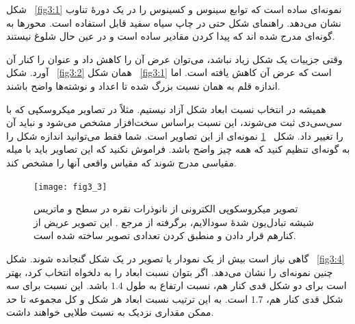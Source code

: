 شکل~%
\ref{fig3:1} 
نمونه‌ای ساده است که توابع سینوس و کسینوس را در یک دورهٔ تناوب نشان می‌دهد. راهنمای شکل حتی در چاپ سیاه سفید قابل استفاده است. محورها به گونه‌ای مدرج شده اند که پیدا کردن مقادیر ساده است و در عین حال شلوغ نیستند.

وقتی جزییات یک شکل زیاد نباشد، می‌توان عرض آن را کاهش داد و عنوان را کنار آن آورد. شکل~%
\ref{fig3:2} 
همان شکل~%
\ref{fig3:1} 
است که عرض آن کاهش یافته است. اما اندازه قلم به همان نسبت بزرگ شده تا اعداد و نوشته‌ها واضح باشند.

\begin{figure}[!tbhp] %
\end{figure}

همیشه در انتخاب نسبت ابعاد شکل آزاد نیستیم. مثلاً در تصاویر میکروسکپی که با سی‌سی‌دی ثبت می‌شوند، این نسبت براساس سخت‌افزار مشخص می‌شود و نباید آن را تغییر داد. شکل~%
\ref{fig3:3} 
نمونه‌ای از این تصاویر است. شما فقط می‌توانید اندازه شکل را به گونه‌ای تنظیم کنید که همه چیز واضح باشد. فراموش نکنید که این تصاویر باید با میله مقیاسی مدرج شوند که مقیاس واقعی آنها را مشخص کند.

\begin{figure}[!tbhp] %
\centering
\texttt{[image: fig3\_3]}
\caption[ %
تصویر میکروسکوپی الکترونی از نانوذرات نقره در شیشه تبادل‌یون شده]{ %
تصویر میکروسکوپی الکترونی از نانوذرات نقره در سطح و ماتریس شیشه تبادل‌یون شدهٔ سودا\dash لایم، برگرفته از مرجع 
. 
این تصویر عریض از کنارهم قرار دادن و منطبق کردن تعدادی تصویر ساخته شده است.}
\label{fig3:3}
\end{figure}

گاهی نیاز است بیش از یک نمودار یا تصویر در یک شکل گنجانده شوند. شکل~%
\ref{fig3:4} 
چنین نمونه‌ای را نشان می‌دهد. اگر بتوان نسبت ابعاد را به دلخواه انتخاب کرد، بهتر است برای دو شکل قدی کنار هم، نسبت ارتفاع به طول
$1.4$ 
باشد. این نسبت برای سه شکل قدی کنار هم، 
$1.7$ 
است. به این ترتیب نسبت ابعاد هر شکل و کل مجموعه تا حد ممکن مقداری نزدیک به نسبت طلایی خواهند داشت.

